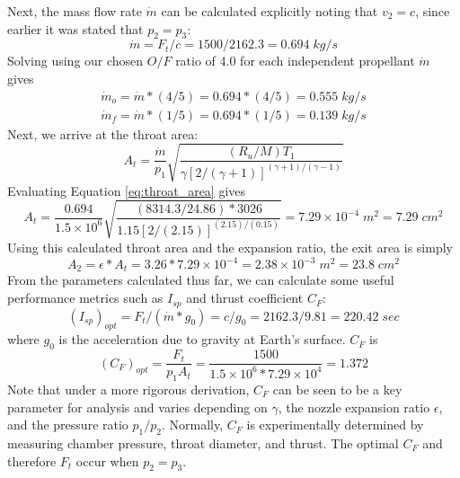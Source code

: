 \documentclass[9pt]{article} %
\numberwithin{equation}{section} %
\begin{document}
Next, the mass flow rate $\dot{m}$ can be calculated explicitly noting that $v_{2} = c$, since earlier it was stated that $p_{2} = p_{3}$:
\begin{equation} \label{eq:mdot}
\dot{m} = F_{t}/c = 1500/2162.3 = 0.694 \; kg/s
\end{equation}
Solving using our chosen $O/F$ ratio of 4.0 for each independent propellant $\dot{m}$ gives
\begin{align*} 
\dot{m}_{o} = \dot{m} * (4/5) = 0.694 * (4/5) = 0.555 \; kg/s \\
\dot{m}_{f} = \dot{m} * (1/5) = 0.694 * (1/5) = 0.139 \; kg/s
\end{align*}
Next, we arrive at the throat area:
\begin{equation} \label{eq:throat_area}
A_{t} = \frac{\dot{m}}{p_{1}} \sqrt{ \frac{(R_{u}/M)T_{1}}{\gamma [2/(\gamma + 1)]^{(\gamma + 1)/(\gamma - 1)}} }
\end{equation}
Evaluating Equation \ref{eq:throat_area} gives
\begin{equation*} 
A_{t} = \frac{0.694}{1.5 \times 10^{6}} \sqrt{ \frac{(8314.3/24.86) * 3026}{1.15 [2/(2.15)]^{(2.15)/(0.15)}} } = 7.29 \times 10^{-4} \; m^{2} = 7.29 \; cm^{2}
\end{equation*}
Using this calculated throat area and the expansion ratio, the exit area is simply
\begin{equation} \label{eq:exit_area}
A_{2} = \epsilon * A_{t} = 3.26 * 7.29 \times 10 ^{-4} = 2.38 \times 10^{-3} \; m^{2} = 23.8 \; cm^{2}
\end{equation}
From the parameters calculated thus far, we can calculate some useful performance metrics such as $I_{sp}$ and thrust coefficient $C_{F}$:
\begin{equation} \label{eq:specific_impulse}
(I_{sp})_{opt} = F_{t}/(\dot{m} * g_{0}) = c/g_{0} = 2162.3/9.81 = 220.42 \; sec
\end{equation}
where $g_{0}$ is the acceleration due to gravity at Earth's surface. $C_{F}$ is
\begin{equation} \label{eq:thrust_coefficient}
(C_{F})_{opt} = \frac{F_{t}}{p_{1}A_{t}} = \frac{1500}{1.5 \times 10^{6} * 7.29 \times 10 ^{4}} = 1.372
\end{equation}
Note that under a more rigorous derivation, $C_{F}$ can be seen to be a key parameter for analysis and varies depending on $\gamma$, the nozzle expansion ratio $\epsilon$, and the pressure ratio $p_{1}/p_{2}$. Normally, $C_{F}$ is experimentally determined by measuring chamber pressure, throat diameter, and thrust. The optimal $C_{F}$ and therefore $F_{t}$ occur when $p_{2} = p_{3}$.
\end{document}
